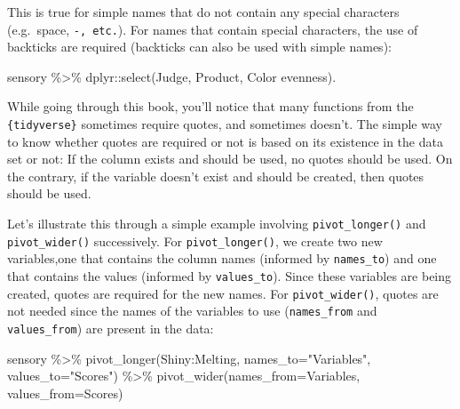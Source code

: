\documentclass[
]{book}
\newenvironment{Shaded}{\begin{snugshade}}{\end{snugshade}}
\newcommand{\AttributeTok}[1]{\textcolor[rgb]{0.77,0.63,0.00}{#1}}
\newcommand{\FunctionTok}[1]{\textcolor[rgb]{0.00,0.00,0.00}{#1}}
\newcommand{\NormalTok}[1]{#1}
\newcommand{\SpecialCharTok}[1]{\textcolor[rgb]{0.00,0.00,0.00}{#1}}
\newcommand{\StringTok}[1]{\textcolor[rgb]{0.31,0.60,0.02}{#1}}
\begin{document}
This is true for simple names that do not contain any special characters (e.g.~space, \texttt{-,\ etc.}). For names that contain special characters, the use of backticks are required (backticks can also be used with simple names):

\begin{Shaded}
\begin{Highlighting}[]
\NormalTok{sensory }\SpecialCharTok{\%\textgreater{}\%} 
\NormalTok{  dplyr}\SpecialCharTok{::}\FunctionTok{select}\NormalTok{(}\StringTok{\textasciigrave{}}\AttributeTok{Judge}\StringTok{\textasciigrave{}}\NormalTok{, Product, }\StringTok{\textasciigrave{}}\AttributeTok{Color evenness}\StringTok{\textasciigrave{}}\NormalTok{).}
\end{Highlighting}
\end{Shaded}

While going through this book, you'll notice that many functions from the \texttt{\{tidyverse\}} sometimes require quotes, and sometimes doesn't. The simple way to know whether quotes are required or not is based on its existence in the data set or not: If the column exists and should be used, no quotes should be used. On the contrary, if the variable doesn't exist and should be created, then quotes should be used.

Let's illustrate this through a simple example involving \texttt{pivot\_longer()} and \texttt{pivot\_wider()} successively. For \texttt{pivot\_longer()}, we create two new variables,one that contains the column names (informed by \texttt{names\_to}) and one that contains the values (informed by \texttt{values\_to}). Since these variables are being created, quotes are required for the new names. For \texttt{pivot\_wider()}, quotes are not needed since the names of the variables to use (\texttt{names\_from} and \texttt{values\_from}) are present in the data:

\begin{Shaded}
\begin{Highlighting}[]
\NormalTok{sensory }\SpecialCharTok{\%\textgreater{}\%} 
  \FunctionTok{pivot\_longer}\NormalTok{(Shiny}\SpecialCharTok{:}\NormalTok{Melting, }\AttributeTok{names\_to=}\StringTok{"Variables"}\NormalTok{, }\AttributeTok{values\_to=}\StringTok{"Scores"}\NormalTok{) }\SpecialCharTok{\%\textgreater{}\%} 
  \FunctionTok{pivot\_wider}\NormalTok{(}\AttributeTok{names\_from=}\NormalTok{Variables, }\AttributeTok{values\_from=}\NormalTok{Scores)}
\end{Highlighting}
\end{Shaded}
\end{document}
